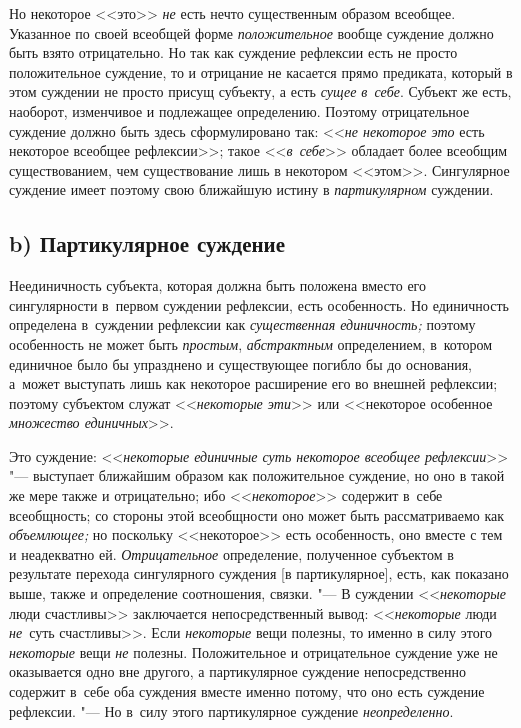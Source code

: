 Но некоторое <<это>> {\em не} есть нечто существенным образом всеобщее.
Указанное по своей всеобщей форме {\em положительное}
вообще суждение должно быть взято отрицательно. Но так как
суждение рефлексии есть не просто положительное суждение, то и отрицание не
касается прямо предиката, который в этом суждении не просто присущ
субъекту, а есть {\em сущее в~себе}.
Субъект же есть, наоборот, изменчивое и подлежащее
определению. Поэтому отрицательное суждение должно быть здесь
сформулировано так: <<{\em не некоторое это} есть некоторое всеобщее
рефлексии>>; такое <<{\em в~себе}>>
обладает более всеобщим существованием, чем существование
лишь в некотором <<этом>>. Сингулярное суждение имеет поэтому свою ближайшую
истину в {\em партикулярном} суждении.

\subsection[b) Партикулярное суждение]{b) Партикулярное суждение}

Неединичность субъекта, которая должна быть положена вместо его сингулярности
в~первом суждении рефлексии, есть особенность. Но единичность определена
в~суждении рефлексии как {\em существенная единичность;} поэтому особенность не
может быть {\em простым}, {\em абстрактным} определением, в~котором единичное
было бы упразднено и существующее погибло бы до основания, а~может выступать
лишь как некоторое расширение его во внешней рефлексии; поэтому субъектом
служат <<{\em некоторые эти}>> или <<некоторое особенное
{\em множество единичных}>>.

Это суждение: <<{\em некоторые единичные суть некоторое всеобщее рефлексии}>>
"--- выступает ближайшим образом как положительное суждение, но оно в такой же
мере также и отрицательно; ибо <<{\em некоторое}>> содержит в~себе всеобщность;
со стороны этой всеобщности оно может быть рассматриваемо как {\em объемлющее;}
но поскольку <<некоторое>> есть особенность, оно вместе с тем и неадекватно ей.
{\em Отрицательное} определение, полученное субъектом в результате перехода
сингулярного суждения [в партикулярное], есть, как показано выше, также и
определение соотношения, связки. "--- В суждении <<{\em некоторые} люди
счастливы>> заключается непосредственный вывод: <<{\em некоторые} люди
{\em не}~суть счастливы>>. Если {\em некоторые} вещи полезны, то именно в силу
этого {\em некоторые} вещи {\em не} полезны. Положительное и отрицательное
суждение уже не оказывается одно вне другого, а партикулярное суждение
непосредственно содержит в~себе оба суждения вместе именно потому, что
оно есть суждение рефлексии. "--- Но в~силу этого партикулярное суждение
{\em неопределенно}.


